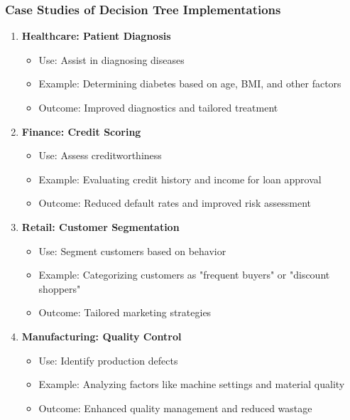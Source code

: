 \documentclass[aspectratio=169]{beamer}
\begin{document}
\begin{frame}[fragile]
    \frametitle{Case Studies of Decision Tree Implementations}
    \begin{enumerate}
        \item \textbf{Healthcare: Patient Diagnosis}
            \begin{itemize}
                \item Use: Assist in diagnosing diseases
                \item Example: Determining diabetes based on age, BMI, and other factors
                \item Outcome: Improved diagnostics and tailored treatment
            \end{itemize}
        \item \textbf{Finance: Credit Scoring}
            \begin{itemize}
                \item Use: Assess creditworthiness
                \item Example: Evaluating credit history and income for loan approval
                \item Outcome: Reduced default rates and improved risk assessment
            \end{itemize}
        \item \textbf{Retail: Customer Segmentation}
            \begin{itemize}
                \item Use: Segment customers based on behavior
                \item Example: Categorizing customers as "frequent buyers" or "discount shoppers"
                \item Outcome: Tailored marketing strategies
            \end{itemize}
        \item \textbf{Manufacturing: Quality Control}
            \begin{itemize}
                \item Use: Identify production defects
                \item Example: Analyzing factors like machine settings and material quality
                \item Outcome: Enhanced quality management and reduced wastage
            \end{itemize}
    \end{enumerate}
\end{frame}
\end{document}
